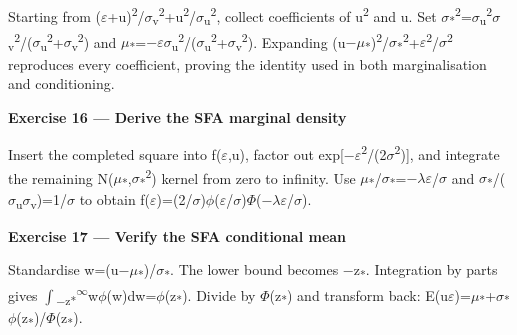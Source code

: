 Starting from (\ensuremath{\varepsilon }+u)\textsuperscript{2}/\ensuremath{\sigma }\textsubscript{v}\textsuperscript{2}+u\textsuperscript{2}/\ensuremath{\sigma }\textsubscript{u}\textsuperscript{2}, collect
coefficients of u\textsuperscript{2} and u. Set
\ensuremath{\sigma }\textsubscript{*}\textsuperscript{2}=\ensuremath{\sigma }\textsubscript{u}\textsuperscript{2}\ensuremath{\sigma }\textsubscript{v}\textsuperscript{2}/(\ensuremath{\sigma }\textsubscript{u}\textsuperscript{2}+\ensuremath{\sigma }\textsubscript{v}\textsuperscript{2})
and
\ensuremath{\mu }\textsubscript{*}=\ensuremath{-}\ensuremath{\varepsilon }\ensuremath{\sigma }\textsubscript{u}\textsuperscript{2}/(\ensuremath{\sigma }\textsubscript{u}\textsuperscript{2}+\ensuremath{\sigma }\textsubscript{v}\textsuperscript{2}).
Expanding (u\ensuremath{-}\ensuremath{\mu }\textsubscript{*})\textsuperscript{2}/\ensuremath{\sigma }\textsubscript{*}\textsuperscript{2}+\ensuremath{\varepsilon }\textsuperscript{2}/\ensuremath{\sigma }\textsuperscript{2} reproduces
every coefficient, proving the identity used in both marginalisation and
conditioning.

\textbf{Exercise 16 --- Derive the SFA marginal density}

Insert the completed square into f(\ensuremath{\varepsilon },u), factor out exp{[}\ensuremath{-}\ensuremath{\varepsilon }\textsuperscript{2}/(2\ensuremath{\sigma }\textsuperscript{2}){]},
and integrate the remaining N(\ensuremath{\mu }\textsubscript{*},\ensuremath{\sigma }\textsubscript{*}\textsuperscript{2})
kernel from zero to infinity. Use
\ensuremath{\mu }\textsubscript{*}/\ensuremath{\sigma }\textsubscript{*}=\ensuremath{-}\ensuremath{\lambda }\ensuremath{\varepsilon }/\ensuremath{\sigma } and
\ensuremath{\sigma }\textsubscript{*}/(\ensuremath{\sigma }\textsubscript{u}\ensuremath{\sigma }\textsubscript{v})=1/\ensuremath{\sigma } to obtain
f(\ensuremath{\varepsilon })=(2/\ensuremath{\sigma })\ensuremath{\phi }(\ensuremath{\varepsilon }/\ensuremath{\sigma })\ensuremath{\Phi }(\ensuremath{-}\ensuremath{\lambda }\ensuremath{\varepsilon }/\ensuremath{\sigma }).

\textbf{Exercise 17 --- Verify the SFA conditional mean}

Standardise w=(u\ensuremath{-}\ensuremath{\mu }\textsubscript{*})/\ensuremath{\sigma }\textsubscript{*}. The lower bound
becomes \ensuremath{-}z\textsubscript{*}. Integration by parts gives
\ensuremath{\int }\textsubscript{\ensuremath{-}z*}\textsuperscript{\ensuremath{\infty }}w\ensuremath{\phi }(w)dw=\ensuremath{\phi }(z\textsubscript{*}).
Divide by \ensuremath{\Phi }(z\textsubscript{*}) and transform back:
E(u\textbar \ensuremath{\varepsilon })=\ensuremath{\mu }\textsubscript{*}+\ensuremath{\sigma }\textsubscript{*}\ensuremath{\phi }(z\textsubscript{*})/\ensuremath{\Phi }(z\textsubscript{*}).


